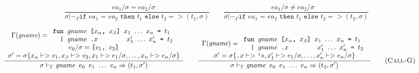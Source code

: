 \documentclass[10pt]{../sigplanconf}
\newcommand{\nfrac}[2]{\frac{\displaystyle{#1}}{\displaystyle{#2}}}
\newcommand{\tagsc}[1]{\tag{\scshape #1}}
\begin{document}
\begin{minipage}{2\linewidth}
  \centering

  \begin{equation}
    \nfrac{
      ea_1/ \sigma = ea_2/\sigma \quad
    }{
      \sigma |-_\Gamma \texttt{if $ea_1$ = $ea_2$ then $t_1$ else $t_2$} => (t_1, \sigma)
    }
    \qquad
    \nfrac{
      ea_1/ \sigma \neq ea_2/\sigma \quad
    }{
      \sigma |-_\Gamma \texttt{if $ea_1$ = $ea_2$ then $t_1$ else $t_2$} => (t_2, \sigma)
    } \tagsc{If}
\end{equation}

\begin{equation}
\hspace{-0.7cm}
  \nfrac{
    \begin{array}{c}
      \Gamma(\textit{gname}) =
      \begin{array}{l}
        \texttt{fun \textit{\rmfamily gname} [$x_\alpha$, $x_\beta$] $x_1$ $\ldots$ $x_n$ = $t_1$} \\
        \texttt{\ \ | \textit{\rmfamily gname}\ \texttt{.}$x$ \hspace{1.1cm} $x_1'$ $\ldots$ $x_n'$ = $t_2$} \\
      \end{array} \\
      e_0/\sigma = \texttt{[$v_1$, $v_2$]} \\
      \sigma' = \sigma\{x_\alpha |-> v_1, x_\beta |-> v_2, x_1 |-> e_1/\sigma, \ldots, x_n |-> e_n/\sigma\} 
    \end{array}
  }{
    \sigma |-_\Gamma \texttt{\textit{\rmfamily gname} $e_0$ $e_1$ $\ldots$ $e_n$} => (t_1, \sigma')
  }
\qquad
  \nfrac{
    \begin{array}{c}
      \Gamma(\textit{gname}) =
      \begin{array}{l}
        \texttt{fun \textit{\rmfamily gname} [$x_\alpha$, $x_\beta$] $x_1$ $\ldots$ $x_n$ = $t_1$} \\
        \texttt{\ \ | \textit{\rmfamily gname}\ \texttt{.}$x$ \hspace{1.1cm} $x_1'$ $\ldots$ $x_n'$ = $t_2$} \\
      \end{array} \\
      \sigma' = \sigma\{\texttt{.}x |-> \texttt{'}s, x_1' |-> e_1/\sigma, \ldots, x_n' |-> e_n/\sigma\}
    \end{array}
  }{
    \sigma |-_\Gamma \texttt{\textit{\rmfamily gname} $e_0$ $e_1$ $\ldots$ $e_n$} => (t_2, \sigma')
  }
  \tagsc{Call-G}
\end{equation}


\end{minipage}
\end{document}
